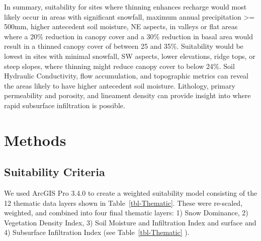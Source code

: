 \documentclass[
  number,
  preprint,
  3p,
  onecolumn]{elsarticle}
\begin{document}
In summary, suitability for sites where thinning enhances recharge would
most likely occur in areas with significant snowfall, maximum annual
precipitation \textgreater= 500mm, higher antecedent soil moisture, NE
aspects, in valleys or flat areas where a 20\% reduction in canopy cover
and a 30\% reduction in basal area would result in a thinned canopy
cover of between 25 and 35\%. Suitability would be lowest in sites with
minimal snowfall, SW aspects, lower elevations, ridge tops, or steep
slopes, where thinning might reduce canopy cover to below 24\%. Soil
Hydraulic Conductivity, flow accumulation, and topographic metrics can
reveal the areas likely to have higher antecedent soil moisture.
Lithology, primary permeability and porosity, and lineament density can
provide insight into where rapid subsurface infiltration is possible.

\section{Methods}\label{methods}

\subsection{Suitability Criteria}\label{suitability-criteria}

We used ArcGIS Pro 3.4.0 to create a weighted suitability model
consisting of the 12 thematic data layers shown in
Table~\ref{tbl-Thematic}. These were re-scaled, weighted, and combined
into four final thematic layers: 1) Snow Dominance, 2) Vegetation
Density Index, 3) Soil Moisture and Infiltration Index and surface and
4) Subsurface Infiltration Index (see Table~\ref{tbl-Thematic} ).
\end{document}
